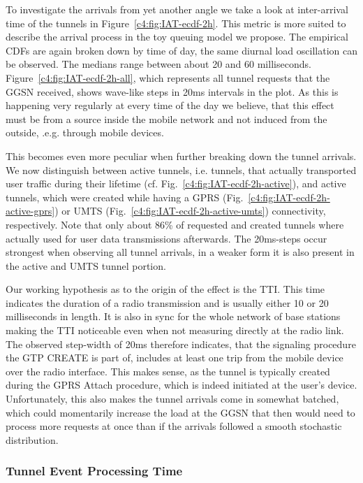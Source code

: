 To investigate the arrivals from yet another angle we take a look at inter-arrival time of the tunnels in Figure~\ref{c4:fig:IAT-ecdf-2h}. This metric is more suited to describe the arrival process in the toy queuing model we propose. The empirical CDFs are again broken down by time of day, the same diurnal load oscillation can be observed. The medians range between about 20 and 60 milliseconds. Figure~\ref{c4:fig:IAT-ecdf-2h-all}, which represents all tunnel requests that the \gls{GGSN} received, shows wave-like steps in 20ms intervals in the plot. As this is happening very regularly at every time of the day we believe, that this effect must be from a source inside the mobile network and not induced from the outside, .e.g. through mobile devices.

This becomes even more peculiar when further breaking down the tunnel arrivals. We now distinguish between active tunnels, i.e. tunnels, that actually transported user traffic during their lifetime (cf. Fig.~\ref{c4:fig:IAT-ecdf-2h-active}), and active tunnels, which were created while having a GPRS (Fig.~\ref{c4:fig:IAT-ecdf-2h-active-gprs}) or UMTS (Fig.~\ref{c4:fig:IAT-ecdf-2h-active-umts}) connectivity, respectively. Note that only about 86\% of requested and created tunnels where actually used for user data transmissions afterwards. The 20ms-steps occur strongest when observing all tunnel arrivals, in a weaker form it is also present in the active and \gls{UMTS} tunnel portion. 

Our working hypothesis as to the origin of the effect is the \gls{TTI}. This time indicates the duration of a radio transmission and is usually either 10 or 20 milliseconds in length. It is also in sync for the whole network of base stations making the \gls{TTI} noticeable even when not measuring directly at the radio link. The observed step-width of 20ms therefore indicates, that the signaling procedure the GTP CREATE is part of, includes at least one trip from the mobile device over the radio interface. This makes sense, as the tunnel is typically created during the GPRS Attach procedure, which is indeed initiated at the user's device. Unfortunately, this also makes the tunnel arrivals come in somewhat batched, which could momentarily increase the load at the \gls{GGSN} that then would need to process more requests at once than if the arrivals followed a smooth stochastic distribution.




\subsubsection{Tunnel Event Processing Time}

